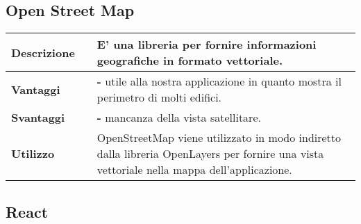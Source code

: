 \newpage
\subsection{Open Street Map}
\label{Open Street Map}
\begin{table}[H]
	\centering
	\begin{tabular}{p{2cm}p{0.5cm}p{11.5cm}}
		\arrayrulecolor{lightgray}
		\toprule
		\textbf{Descrizione} & &
		E' una libreria \js{} per fornire informazioni geografiche in formato vettoriale.
		\\ \midrule
		\textbf{Vantaggi} & &
		\textbf{- }utile alla nostra applicazione in quanto mostra il perimetro di molti edifici.
		\\ \midrule
		\textbf{Svantaggi} & &
		\textbf{- }mancanza della vista satellitare.
		\\ \midrule
		\textbf{Utilizzo} & &
		OpenStreetMap viene utilizzato in modo indiretto dalla libreria OpenLayers per fornire una vista
		vettoriale nella mappa dell'applicazione.
		\\\bottomrule
	\end{tabular}
\end{table}





\vspace{40px}
\subsection{React}
\label{React}

